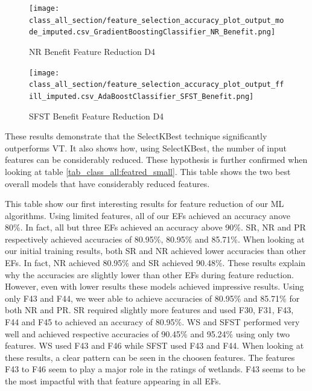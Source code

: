 \documentclass[12pt,letterpaper]{article}
\begin{document}
\begin{figure}[h]
    \centering
    \texttt{[image: class\_all\_section/feature\_selection\_accuracy\_plot\_output\_mode\_imputed.csv\_GradientBoostingClassifier\_NR\_Benefit.png]}
    \caption{NR Benefit Feature Reduction D4}
    \label{class_all_tab:featred_nr}
\end{figure}



\begin{figure}[h]
    \centering
    \texttt{[image: class\_all\_section/feature\_selection\_accuracy\_plot\_output\_ffill\_imputed.csv\_AdaBoostClassifier\_SFST\_Benefit.png]}
    \caption{SFST Benefit Feature Reduction D4}
    \label{class_all_tab:featred_sfst}
\end{figure}

These results demonstrate that the SelectKBest technique significantly outperforms \ac{VT}.
It also shows how, using SelectKBest, the number of input features can be considerably reduced.
These hypothesis is further confirmed when looking at table \ref{tab_class_all:featred_small}.
This table shows the two best overall models that have considerably reduced features.

This table show our first interesting results for feature reduction of our \ac{ML} algorithms.
Using limited features, all of our \ac{EF}s achieved an accuracy anove 80\%.
In fact, all but three \ac{EF}s achieved an accuracy above 90\%.
\ac{SR}, \ac{NR} and \ac{PR} respectively achieved accuracies of 80.95\%, 80.95\% and 85.71\%.
When looking at our initial training results, both \ac{SR} and \ac{NR} achieved lower accuracies than other \ac{EF}s.
In fact, \ac{NR} achieved 80.95\% and \ac{SR} achieved 90.48\%.
These results explain why the accuracies are slightly lower than other \ac{EF}s during feature reduction.
However, even with lower results these models achieved impressive results.
Using only F43 and F44, we weer able to achieve accuracies of 80.95\% and 85.71\% for both \ac{NR} and \ac{PR}.
\ac{SR} required slightly more features and used F30, F31, F43, F44 and F45 to achieved an accuracy of 80.95\%.
\ac{WS} and \ac{SFST} performed very well and achieved respective accuracies of 90.45\% and 95.24\% using only two features.
\ac{WS} used F43 and F46 while \ac{SFST} used F43 and F44.
When looking at these results, a clear pattern can be seen in the choosen features.
The features F43 to F46 seem to play a major role in the ratings of wetlands.
F43 seems to be the most impactful with that feature appearing in all \ac{EF}s.
\end{document}

